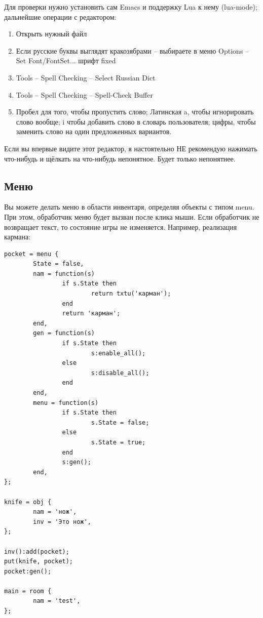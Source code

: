 \documentclass[a4paper,12pt]{article}
\begin{document}
Для проверки нужно установить сам Emacs и поддержку Lua к нему (lua-mode); дальнейшие операции с редактором:

\begin{enumerate}
\item Открыть нужный файл
\item Если русские буквы выглядят кракозябрами -- выбираете в меню Options -- Set Font/FontSet... шрифт fixed
\item Tools -- Spell Checking -- Select Russian Dict
\item Tools -- Spell Checking -- Spell-Check Buffer
\item Пробел для того, чтобы пропустить слово; Латинская a, чтобы игнорировать слово вообще; i чтобы добавить слово в словарь пользователя; цифры, чтобы заменить слово на один предложенных вариантов.
\end{enumerate}

Если вы впервые видите этот редактор, я настоятельно НЕ рекомендую нажимать что-нибудь и щёлкать на что-нибудь непонятное. Будет только непонятнее.

\subsection{Меню}
Вы можете делать меню в области инвентаря, определяя объекты с типом menu. При этом, обработчик меню будет вызван после клика мыши. Если обработчик не возвращает текст, то состояние игры не изменяется. Например, реализация кармана:

\begin{verbatim}
pocket = menu {
        State = false,
        nam = function(s)
                if s.State then
                        return txtu('карман');
                end
                return 'карман';
        end,
        gen = function(s)
                if s.State then
                        s:enable_all();
                else
                        s:disable_all();
                end
        end,
        menu = function(s)
                if s.State then
                        s.State = false;
                else
                        s.State = true;
                end
                s:gen();
        end,
};

knife = obj {
        nam = 'нож',
        inv = 'Это нож',
};

inv():add(pocket);
put(knife, pocket);
pocket:gen();

main = room {
        nam = 'test',
};
\end{verbatim}
\end{document}
